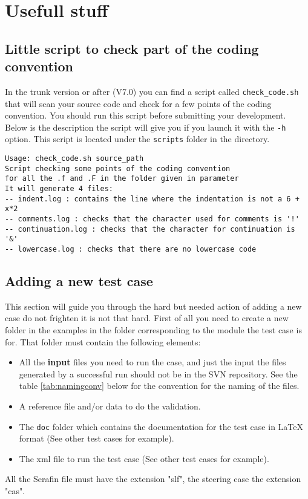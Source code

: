 %
\chapter{Usefull stuff}
%
\section{Little script to check part of the coding convention}
%
In the trunk version or after (V7.0) you can find a script called
\verb!check_code.sh! that will scan your source code and check for a few points
of the coding convention. You should run this script before submitting your
development. Below is the description the script will give you if you launch it
with the \verb!-h! option. This script is located under the \verb!scripts!
folder in the \telemacsystem directory.
\begin{lstlisting}
Usage: check_code.sh source_path
Script checking some points of the coding convention
for all the .f and .F in the folder given in parameter
It will generate 4 files:
-- indent.log : contains the line where the indentation is not a 6 + x*2
-- comments.log : checks that the character used for comments is '!'
-- continuation.log : checks that the character for continuation is '&'
-- lowercase.log : checks that there are no lowercase code
\end{lstlisting}

\section{Adding a new test case}
%
This section will guide you through the hard but needed action of adding a new
case do not frighten it is not that hard. First of all you need to create a new
folder in the examples in the folder corresponding to the module the test case
is for. That folder must contain the following elements:
\begin{itemize}
\item All the \textbf{input} files you need to run the case, and just the input
the files generated by a successful run should not be in the SVN repository.
See the table \ref{tab:namingconv} below for the convention for the naming of
the files.
\item A reference file and/or data to do the validation.
\item The \verb!doc! folder which contains the documentation for the test case
in LaTeX format (See other test cases for example).
\item The xml file to run the test case (See other test cases for example).
\end{itemize}
All the Serafin file must have the extension "slf", the steering case the
extension "cas".


